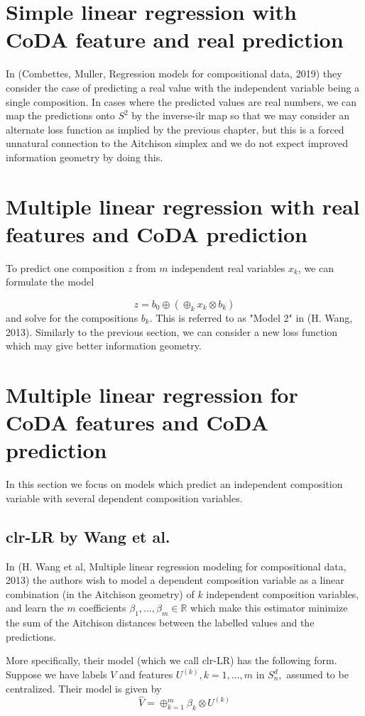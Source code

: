 \documentclass[BSc]{usydthesis}
\numberwithin{equation}{chapter}
\theoremstyle{remark}
\begin{document}
\section{Simple linear regression with CoDA feature and real prediction}
In (Combettes, Muller, Regression models for compositional data, 2019) they consider the case of predicting a real value with the independent variable being a single composition. In cases where the predicted values are real numbers, we can map the predictions onto $S^2$ by the inverse-ilr map so that we may consider an alternate loss function as implied by the previous chapter, but this is a forced unnatural connection to the Aitchison simplex and we do not expect improved information geometry by doing this. 

\section{Multiple linear regression with real features and CoDA prediction}
To predict one composition $z$ from $m$ independent real variables $x_k$, we can formulate the model 

$$ z = b_0 \oplus (\oplus_{k} x_k \otimes b_k)$$ and solve for the compositions $b_k.$ This is referred to as "Model 2" in (H. Wang, 2013). Similarly to the previous section, we can consider a new loss function which may give better information geometry.

\section{Multiple linear regression for CoDA features and CoDA prediction}

In this section we focus on models which predict an independent composition variable with several dependent composition variables.

\subsection{clr-LR by Wang et al.}
In (H. Wang et al, Multiple linear regression modeling for compositional data, 2013) the authors wish to model a dependent composition variable as a linear combination (in the Aitchison geometry) of $k$ independent composition variables, and learn the $m$ coefficients $\beta_1, \ldots, \beta_m \in \mathbb{R}$ which make this estimator minimize the sum of the Aitchison distances between the labelled values and the predictions. \

More specifically, their model (which we call clr-LR) has the following form. Suppose we have labels $V$ and features $U^{(k)}, k=1,\ldots, m$ in $S^d_n,$ assumed to be centralized. Their model is given by $$ \hat{V} = \oplus_{k=1}^m \beta_k \otimes U^{(k)} $$
\end{document}
